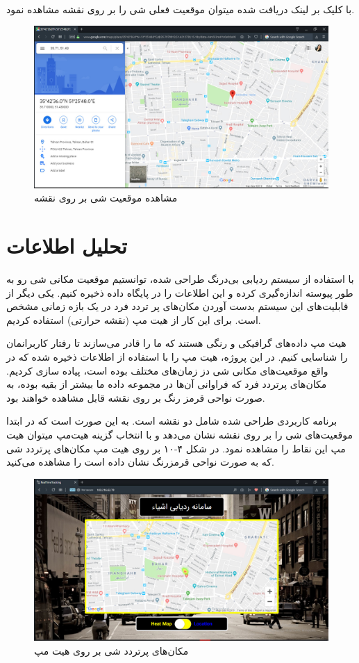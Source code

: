 \\
با کلیک بر لینک دریافت شده میتوان موقعیت فعلی شی را بر روی نقشه مشاهده نمود.\\
 \begin{figure}[!h]
	\centerline{\includegraphics[width=.8\textwidth]{map}}
	\caption{مشاهده موقعیت شی بر روی نقشه}
\end{figure}
\newpage
\section{تحلیل اطلاعات} 
با استفاده از سیستم ردیابی بی‌درنگ طراحی شده، توانستیم موقعیت مکانی شی رو به طور پیوسته اندازه‌گیری کرده و این اطلاعات را در پایگاه داده ذخیره کنیم.
یکی دیگر از قابلیت‌های این سیستم بدست آوردن مکان‌های پر تردد فرد در یک بازه زمانی مشخص است. برای این کار از هیت مپ (نقشه حرارتی) استفاده کردیم.


هیت مپ داده‌های گرافیکی و رنگی هستند که ما را قادر می‌سازند تا رفتار کاربرانمان را شناسایی کنیم. در این پروژه، هیت مپ را با استفاده از اطلاعات ذخیره شده که در واقع موقعیت‌های مکانی شی دز زمان‌های مختلف بوده است، پیاده سازی کردیم. مکان‌های پرتردد فرد که فراوانی آن‌ها در مجموعه داده ما بیشتر از بقیه بوده، به صورت نواحی قرمز رنگ بر روی نقشه قابل مشاهده خواهند بود.


برنامه کاربردی طراحی شده شامل دو نقشه است. به این صورت است که در ابتدا موقعیت‌های شی را بر روی نقشه نشان می‌دهد و با انتخاب گزینه هیت‌مپ میتوان هیت مپ این نقاط را مشاهده نمود. در شکل ۴-۱۰ بر روی هیت مپ مکان‌های پرتردد شی که به صورت نواحی قرمزرنگ نشان داده است را مشاهده می‌کنید.

 \begin{figure}[!h]
	\centerline{\includegraphics[width=.9\textwidth]{heatmap2}}
	\caption{مکان‌های پرتردد شی بر روی هیت مپ}
\end{figure}

